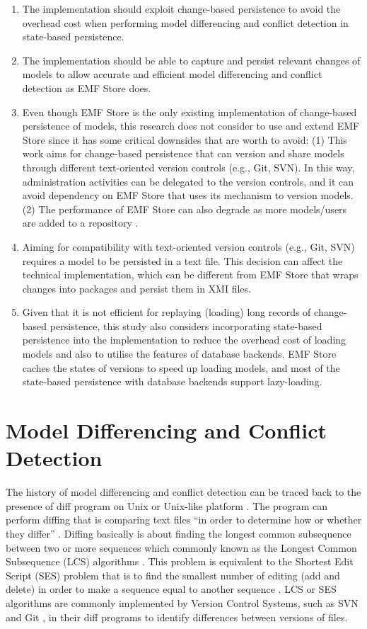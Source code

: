 \begin{enumerate}
  \item The implementation should exploit change-based persistence to avoid the overhead cost when performing model differencing and conflict detection in state-based persistence.
  \item The implementation should be able to capture and persist relevant changes of models to allow accurate and efficient model differencing and conflict detection as EMF Store does.
  \item Even though EMF Store is the only existing implementation of change-based persistence of models, this research does not consider to use and extend EMF Store since it has some critical downsides that are worth to avoid: (1) This work aims for change-based persistence that can version and share models through different text-oriented version controls (e.g., Git, SVN). In this way, administration activities can be delegated to the version controls, and it can avoid dependency on EMF Store that uses its mechanism to version models. (2) The performance of EMF Store can also degrade as more models/users are added to a repository \cite{KolovosRMPGCLRV13}.
  \item Aiming for compatibility with text-oriented version controls (e.g., Git, SVN) requires a model to be persisted in a text file. This decision can affect the technical implementation, which can be different from EMF Store that wraps changes into packages and persist them in XMI files.
  \item Given that it is not efficient for replaying (loading) long records of change-based persistence, this study also considers incorporating state-based persistence into the implementation to reduce the overhead cost of loading models and also to utilise the features of database backends. EMF Store caches the states of versions to speed up loading models, and most of the state-based persistence with database backends support lazy-loading.
\end{enumerate}

\section{Model Differencing and Conflict Detection}
\label{sec:model_differencing_and_conflict_detection}
The history of model differencing and conflict detection can be traced back to the presence of \textsf{diff} program on Unix or Unix-like platform \cite{hunt1976algorithm}. The program can perform diffing that is comparing text files ``in order to determine how or whether they differ'' \cite{diff}. Diffing basically is about finding the longest common subsequence between two or more sequences which commonly known as the Longest Common Subsequence (LCS) algorithms \cite{bergroth2000lcs}. This problem is equivalent to the Shortest Edit Script (SES) problem that is to find the smallest number of editing (add and delete) in order to make a sequence equal to another sequence \cite{DBLP:journals/algorithmica/Meyers86}. LCS or SES algorithms are commonly implemented by Version Control Systems, such as SVN \cite{svn-diff} and Git \cite{git-diff}, in their \textsf{diff} programs to identify differences between versions of files.   

